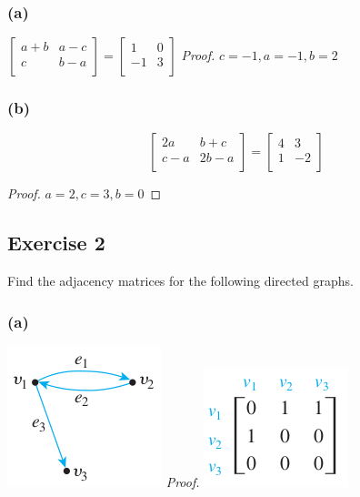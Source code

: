 \documentclass[14pt]{extarticle}
\begin{document}
\subsubsection{(a)}
\(
\left[ 
\begin{array}{cc}
a + b & a - c \\
c & b - a \\
\end{array}
\right] = 
\left[ 
\begin{array}{rr}
1 & 0 \\
-1 & 3 \\
\end{array}
\right]
\)
{\it Proof.} \(c=-1, a=-1, b=2\)

\subsubsection{(b)}
\[
\left[ 
\begin{array}{cc}
2a & b + c \\
c - a & 2b - a \\
\end{array}
\right] = 
\left[ 
\begin{array}{rr}
4 & 3 \\
1 & -2 \\
\end{array}
\right]
\]
\begin{proof}
\(a=2, c=3, b=0\)
\end{proof}

\subsection{Exercise 2}
Find the adjacency matrices for the following directed graphs.

\subsubsection{(a)}
\includegraphics[scale=0.6]{../images/10.2.2.a.1.png}
{\it Proof.}
\includegraphics[scale=0.6]{../images/10.2.2.a.png}
\end{document}

